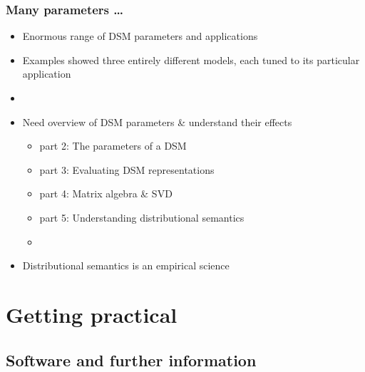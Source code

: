 \documentclass[t]{beamer} %
\begin{document}
\begin{frame}
  \frametitle{Many parameters \ldots}

  \begin{itemize}
  \item Enormous range of DSM parameters and applications
  \item Examples showed three entirely different models, each tuned to
    its particular application
  \item[]
  \item<2->[\So] Need overview of DSM parameters \& understand their effects
    \begin{itemize}
    \item part 2: The parameters of a DSM
    \item part 3: Evaluating DSM representations
    \item part 4: Matrix algebra \& SVD
    \item part 5: Understanding distributional semantics
    \item[]
    \end{itemize}
  \item<3->[\So] Distributional semantics is an empirical science
  \end{itemize}
\end{frame}

\section{Getting practical}

\subsection{Software and further information}
\end{document}
